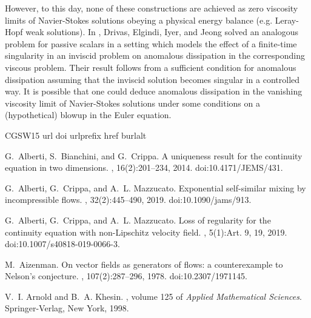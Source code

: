 \documentclass[12pt]{report}   %
\numberwithin{equation}{section}
\theoremstyle{plain}
\theoremstyle{definition}
\theoremstyle{remark}
\begin{document}
However, to this day, none of these constructions are achieved as zero viscosity limits of  Navier-Stokes solutions obeying a physical energy balance (e.g. Leray-Hopf weak solutions).  In \cite{DrivasElgindiEA22}, Drivas, Elgindi, Iyer, and Jeong solved an analogous problem for passive scalars in a setting which models the effect of a finite-time singularity in an inviscid problem
on anomalous dissipation in the corresponding viscous problem.  Their result follows from a sufficient condition for anomalous dissipation assuming that the inviscid solution becomes singular in
a controlled way. It is possible that one could deduce anomalous dissipation in the vanishing viscosity limit of Navier-Stokes solutions under some conditions on a (hypothetical) blowup in the Euler equation.

\newcommand{\etalchar}[1]{$^{#1}$}
\begin{thebibliography}{CGSW15}
\expandafter\ifx\csname url\endcsname\relax
  \def\url#1{\texttt{#1}}\fi
\expandafter\ifx\csname doi\endcsname\relax
  \def\doi#1{\burlalt{doi:#1}{http://dx.doi.org/#1}}\fi
\expandafter\ifx\csname urlprefix\endcsname\relax\def\urlprefix{URL }\fi
\expandafter\ifx\csname href\endcsname\relax
  \def\href#1#2{#2}\fi
\expandafter\ifx\csname burlalt\endcsname\relax
  \def\burlalt#1#2{\href{#2}{#1}}\fi

G.~Alberti, S.~Bianchini, and G.~Crippa.
\newblock A uniqueness result for the continuity equation in two dimensions.
, 16(2):201--234, 2014.
\newblock \doi{10.4171/JEMS/431}.

G.~Alberti, G.~Crippa, and A.~L. Mazzucato.
\newblock Exponential self-similar mixing by incompressible flows.
, 32(2):445--490, 2019.
\newblock \doi{10.1090/jams/913}.

G.~Alberti, G.~Crippa, and A.~L. Mazzucato.
\newblock Loss of regularity for the continuity equation with non-{L}ipschitz
  velocity field.
, 5(1):Art. 9, 19, 2019.
\newblock \doi{10.1007/s40818-019-0066-3}.

M.~Aizenman.
\newblock On vector fields as generators of flows: a counterexample to
  {N}elson's conjecture.
, 107(2):287--296, 1978.
\newblock \doi{10.2307/1971145}.

V.~I. Arnold and B.~A. Khesin.
, volume 125 of {\em
  Applied Mathematical Sciences}.
\newblock Springer-Verlag, New York, 1998.


\end{thebibliography}
\end{document}
